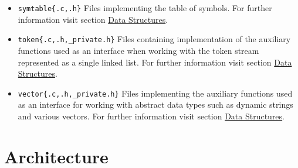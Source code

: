 \documentclass[12pt]{article}
\begin{document}
\begin{itemize}
	\item \texttt{symtable\{.c,.h\}} Files implementing the table of symbols. For further information visit section \hyperref[sec:datastruct]{Data Structures}.
	\item \texttt{token\{.c,.h,\_private.h\}} Files containing implementation of the auxiliary functions used as an interface when working with the token stream represented as a single linked list. For further information visit section \hyperref[sec:datastruct]{Data Structures}.
 	\item \texttt{vector\{.c,.h,\_private.h\}} Files implementing the auxiliary functions used as an interface for working with abstract data types such as dynamic strings and various vectors. For further information visit section \hyperref[sec:datastruct]{Data Structures}.
\end{itemize} 	
\section{Architecture}
\end{document}
